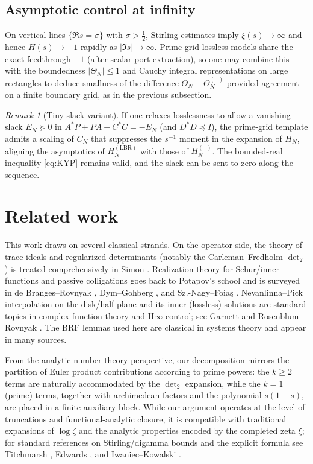 \documentclass[11pt]{article}
\theoremstyle{definition}
\theoremstyle{remark}
\newtheorem{remark}[theorem]{Remark}
\DeclareMathOperator{\dettwo}{det_2}
\begin{document}
\subsection{Asymptotic control at infinity}
On vertical lines \(\{\Re s=\sigma\}\) with \(\sigma>\tfrac12\), Stirling estimates imply \(\xi(s)\to\infty\) and hence \(H(s)\to -1\) rapidly as \(|\Im s|\to\infty\). Prime-grid lossless models share the exact feedthrough \(-1\) (after scalar port extraction), so one may combine this with the boundedness \(|\Theta_N|\le 1\) and Cauchy integral representations on large rectangles to deduce smallness of the difference \(\Theta_N-\Theta_N^{(\dettwo)}\) provided agreement on a finite boundary grid, as in the previous subsection.
\begin{remark}[Tiny slack variant]
If one relaxes losslessness to allow a vanishing slack \(E_N\succeq 0\) in \(A^*P+PA+C^*C=-E_N\) (and \(D^*D\preceq I\)), the prime-grid template admits a scaling of \(C_N\) that suppresses the \(s^{-1}\) moment in the expansion of \(H_N\), aligning the asymptotics of \(H_N^{(\mathrm{LBR})}\) with those of \(H_N^{(\dettwo)}\). The bounded-real inequality \eqref{eq:KYP} remains valid, and the slack can be sent to zero along the sequence.
\end{remark}

\fi %
\section{Related work}\label{sec:related}
This work draws on several classical strands. On the operator side, the theory of trace ideals and regularized determinants (notably the Carleman--Fredholm \(\det_2\)) is treated comprehensively in Simon \cite{SimonTraceIdeals}. Realization theory for Schur/inner functions and passive colligations goes back to Potapov's school and is surveyed in de Branges--Rovnyak \cite{deBrangesRovnyak}, Dym--Gohberg \cite{DymGohberg}, and Sz.-Nagy--Foia\c{s} \cite{SzNagyFoias}. Nevanlinna--Pick interpolation on the disk/half-plane and its inner (lossless) solutions are standard topics in complex function theory and H\(\infty\) control; see Garnett \cite{Garnett} and Rosenblum--Rovnyak \cite{RosenblumRovnyak}. The BRF lemmas used here are classical in systems theory and appear in many sources.

From the analytic number theory perspective, our decomposition mirrors the partition of Euler product contributions according to prime powers: the \(k\ge 2\) terms are naturally accommodated by the \(\det_2\) expansion, while the \(k=1\) (prime) terms, together with archimedean factors and the polynomial \(s(1-s)\), are placed in a finite auxiliary block. While our argument operates at the level of truncations and functional-analytic closure, it is compatible with traditional expansions of \(\log \zeta\) and the analytic properties encoded by the completed zeta \(\xi\); for standard references on Stirling/digamma bounds and the explicit formula see Titchmarsh \cite{TitchmarshZeta}, Edwards \cite{Edwards}, and Iwaniec--Kowalski \cite{IwaniecKowalski}.
\end{document}
